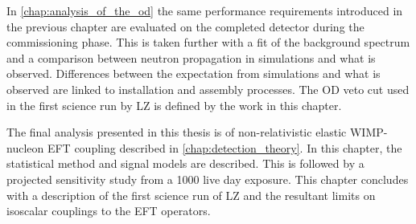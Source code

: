 \par
In \autoref{chap:analysis_of_the_od} the same performance requirements introduced in the previous chapter are evaluated on the completed detector during the commissioning phase.
This is taken further with a fit of the background spectrum and a comparison between neutron propagation in simulations and what is observed.
Differences between the expectation from simulations and what is observed are linked to installation and assembly processes.
The OD veto cut used in the first science run by LZ is defined by the work in this chapter.

\par
The final analysis presented in this thesis is of non-relativistic elastic WIMP-nucleon EFT coupling described in \autoref{chap:detection_theory}.
In this chapter, the statistical method and signal models are described.
This is followed by a projected sensitivity study from a 1000 live day exposure.
This chapter concludes with a description of the first science run of LZ and the resultant limits on isoscalar couplings to the EFT operators.
